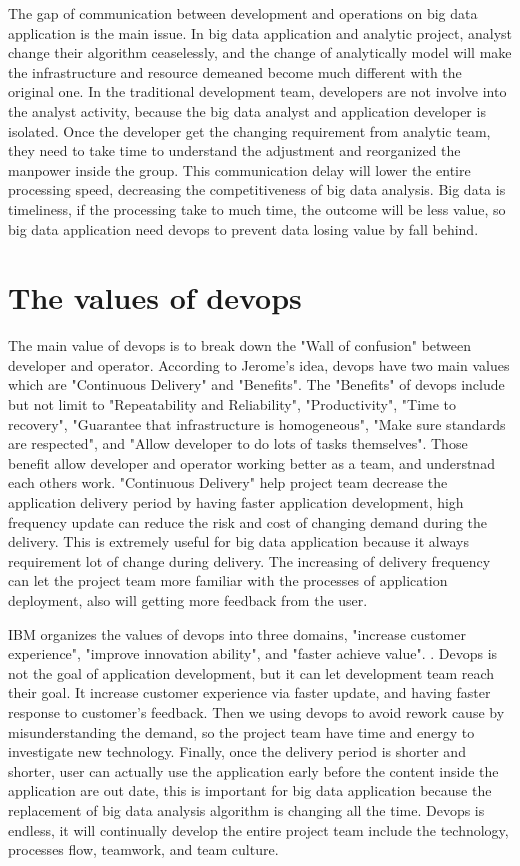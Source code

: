 \documentclass[sigconf]{acmart}
\begin{document}
The gap of communication between development and operations on big data application is the main issue. In big data application and analytic project, analyst change their algorithm ceaselessly, and the change of analytically model will make the infrastructure and resource demeaned become much different with the original one. In the traditional development team, developers are not involve into the analyst activity, because the big data analyst and application developer is isolated. Once the developer get the changing requirement from analytic team, they need to take time to understand the adjustment and reorganized the manpower inside the group. This communication delay will lower the entire processing speed, decreasing the competitiveness of big data analysis. Big data is timeliness, if the processing take to much time, the outcome will be less value, so big data application need devops to prevent data losing value by fall behind. 

\section{The values of devops}

The main value of devops is to break down the "Wall of confusion" between developer and operator. According to Jerome's idea, devops have two main values which are "Continuous Delivery" and "Benefits". \cite{devops:01}  The "Benefits" of devops include but not limit to "Repeatability and Reliability", "Productivity", "Time to recovery", "Guarantee that infrastructure is homogeneous", "Make sure standards are respected", and "Allow developer to do lots of tasks themselves". Those benefit allow developer and operator working better as a team, and understnad each others work. "Continuous Delivery" help project team decrease the application delivery period by having faster application development, high frequency update can reduce the risk and cost of changing demand during the delivery. This is extremely useful for big data application because it always requirement lot of change during delivery. The increasing of delivery frequency can let the project team more familiar with the processes of application deployment, also will getting more feedback from the user.

IBM organizes the values of devops into three domains, "increase customer experience", "improve innovation ability", and "faster achieve value". \cite{IBM:01}. Devops is not the goal of application development, but it can let development team reach their goal. It increase customer experience via faster update, and having faster response to customer's feedback. Then we using devops to avoid rework cause by misunderstanding the demand, so the project team have time and  energy to investigate new technology. Finally, once the delivery period is shorter and shorter, user can actually use the application early before the content inside the application are out date, this is important for big data application because the replacement of big data analysis algorithm is changing all the time. Devops is endless, it will continually develop the entire project team include the technology, processes flow, teamwork, and team culture. 
\end{document}
